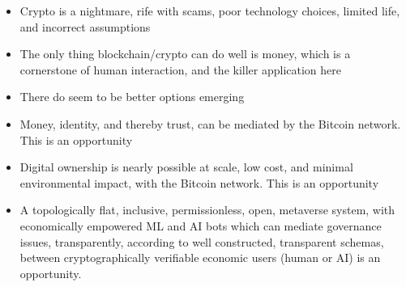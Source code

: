 {\begin{itemize}
\item Crypto is a nightmare, rife with scams, poor technology choices, limited life, and incorrect assumptions
\item The only thing blockchain/crypto can do well is money, which is a cornerstone of human interaction, and the killer application here
\item There do seem to be better options emerging
\item Money, identity, and thereby trust, can be mediated by the Bitcoin network. This is an opportunity
\item Digital ownership is nearly possible at scale, low cost, and minimal environmental impact, with the Bitcoin network. This is an opportunity
\item A topologically flat, inclusive, permissionless, open, metaverse system, with economically empowered ML and AI bots which can mediate governance issues, transparently, according to well constructed, transparent schemas, between cryptographically verifiable economic users (human or AI) is an opportunity.
\end{itemize}
}
